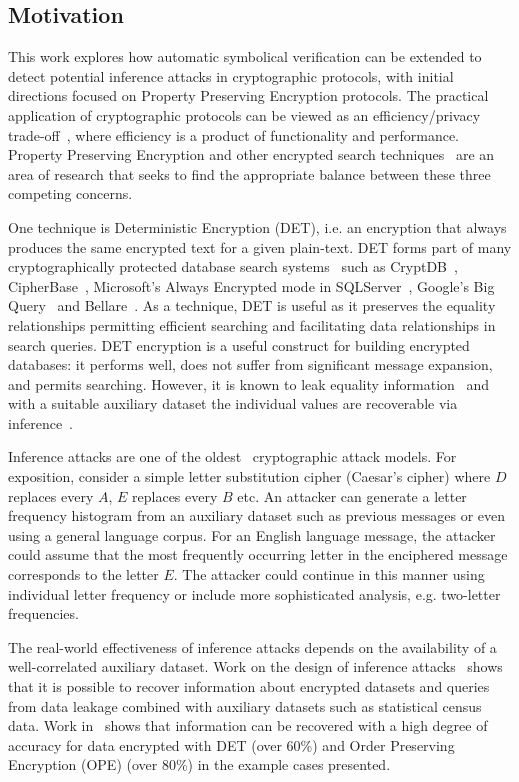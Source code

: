 \documentclass[journal]{IEEEtran}
\begin{document}
\subsection{Motivation}
This work explores how automatic symbolical verification can be extended to detect potential inference attacks in cryptographic protocols, with initial directions focused on Property Preserving Encryption protocols.
The practical application of cryptographic protocols can be viewed as an efficiency/privacy trade-off~\cite{GenericAttacks}, where efficiency is a product of functionality and performance. Property Preserving Encryption and other encrypted search techniques~\cite{SOK2017} are an area of research that seeks to find the appropriate balance between these three competing concerns.   

One technique is Deterministic Encryption (DET), i.e. an encryption that always produces the same encrypted text for a given plain-text. DET forms part of many cryptographically protected database search systems~\cite{SOK2017} such as CryptDB~\cite{Popa2011}, CipherBase~\cite{cipherbase}, Microsoft's Always Encrypted mode in SQLServer~\cite{AlwaysEncrypted}, Google's Big Query~\cite{BigQuery} and Bellare~\cite{Bellare2007}. As a technique, DET is useful as it preserves the equality relationships permitting efficient searching and facilitating data relationships in search queries. DET encryption is a useful construct for building encrypted databases: it performs well, does not suffer from significant message expansion, and permits searching. However, it is known to leak equality information~\cite{SOK2017} and with a suitable auxiliary dataset the individual values are recoverable via inference~\cite{InfrenceAttacks}. 

Inference attacks are one of the oldest~\cite{Arab} cryptographic attack models. For exposition, consider a simple letter substitution cipher (Caesar's cipher) where $D$ replaces every $A$, $E$ replaces every $B$ etc. An attacker can generate a letter frequency histogram from an auxiliary dataset such as previous messages or even using a general language corpus. For an English language message, the attacker could assume that the most frequently occurring letter in the enciphered message corresponds to the letter $E$. The attacker could continue in this manner using individual letter frequency or include more sophisticated analysis, e.g. two-letter frequencies.

The real-world effectiveness of inference attacks depends on the availability of a well-correlated auxiliary dataset. Work on the design of inference attacks~\cite{Ismal2012} shows that it is possible to recover information about encrypted datasets and queries from data leakage combined with auxiliary datasets such as statistical census data. Work in~\cite{InfrenceAttacks} shows that information can be recovered with a high degree of accuracy for data encrypted with DET (over 60\%) and Order Preserving Encryption (OPE) (over 80\%) in the example cases presented.
\end{document}
